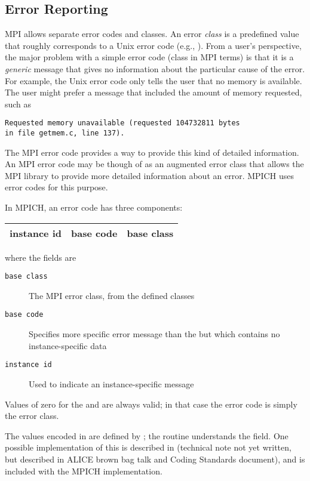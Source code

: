 \documentclass{article}
\begin{document}
\subsection{Error Reporting}
MPI allows separate error codes and classes.  An error \emph{class} is
a predefined value that roughly corresponds to a Unix error code
(e.g., ).  From a user's perspective, the major problem
with a simple error code (class in MPI terms) is that it is a
\emph{generic} message that gives no information about the particular
cause of the error.  For example, the Unix error code 
only tells the user that no memory is available.  The user might
prefer a message that included the amount of memory requested, such as 
\begin{verbatim}
Requested memory unavailable (requested 104732811 bytes 
in file getmem.c, line 137).
\end{verbatim}
The MPI error code provides a way to provide this kind of detailed
information.  An MPI error code may be though of as an
augmented error class that allows the MPI library to provide more
detailed information about an error.  MPICH uses error codes for this
purpose.  

In MPICH, an error code has three components:

\begin{center}
\begin{tabular}{|c|c|c|}
\hline
instance id&base code&base class\\
\hline
\end{tabular}
\end{center}
where the fields are
\begin{description}
\item[\texttt{base class}]The MPI error class, from the defined classes
\item[\texttt{base code}]Specifies more specific error message than
the  but which contains no instance-specific data
\item[\texttt{instance id}]Used to indicate an instance-specific message
\end{description}

Values of zero for the  and  are
always valid; in that case the error code is simply the error class.

The values encoded in  are defined by
; the routine 
understands the  field.  One possible implementation
of this is described in (technical note not yet written, but described
in ALICE brown bag talk and Coding Standards document), and is
included with the MPICH implementation.
\end{document}
